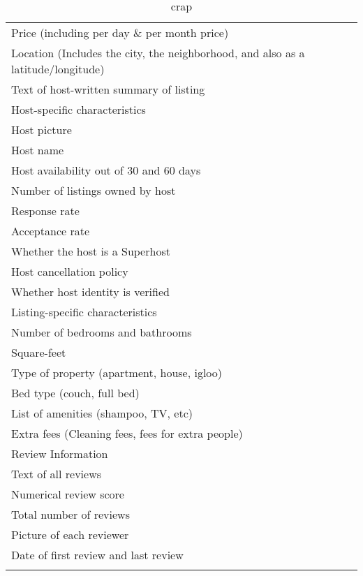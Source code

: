 {
\def\sym#1{\ifmmode^{#1}\else\(^{#1}\)\fi}
\begin{longtable}{l*{1}{c}}
\caption{testing}\\
\hline\hline\endfirsthead\hline\endhead\hline\endfoot\endlastfoot

\hline

Price (including per day \& per month price) \\
[1em]
Location (Includes the city, the neighborhood, and also as a latitude/longitude) \\
[1em]
Text of host-written summary of listing \\
\hline\hline
Host-specific characteristics \\
[1em]
Host picture\\ 
[1em]
Host name\\
[1em]
Host availability out of 30 and 60 days\\
[1em]
Number of listings owned by host\\
[1em]
Response rate\\
[1em]
Acceptance rate\\
[1em]
Whether the host is a Superhost \\
[1em]
Host cancellation policy\\
[1em]
Whether host identity is verified \\

\hline\hline
Listing-specific characteristics \\
\hline
Number of bedrooms and bathrooms \\
[1em]
Square-feet \\
[1em]
Type of property (apartment, house, igloo)\\
[1em]
Bed type (couch, full bed)\\
[1em]
List of amenities (shampoo, TV, etc)\\
[1em]
Extra fees (Cleaning fees, fees for extra people) \\

\hline\hline
Review Information \\
\hline
Text of all reviews \\
[1em]
Numerical review score \\
[1em]
Total number of reviews \\
[1em]
Picture of each reviewer \\
[1em]
Date of first review and last review \\

\hline\hline
\caption*{crap}



\end{longtable}
}
